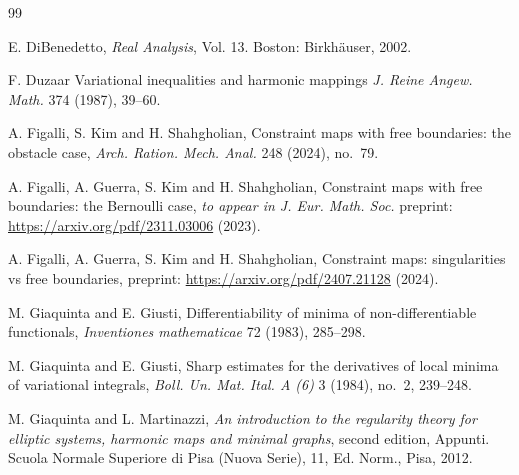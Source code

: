 \documentclass[11pt]{amsart}
\theoremstyle{plain}
\theoremstyle{definition}
\theoremstyle{remark}
\numberwithin{equation}{section}
\begin{document}








\begin{thebibliography}{99}

E. DiBenedetto,
{\it Real Analysis}, Vol. 13. Boston: Birkh\"auser, 2002.

F. Duzaar
Variational inequalities and harmonic mappings
{\it J. Reine Angew. Math.} 374 (1987), 39–60.

A. Figalli, S. Kim and H. Shahgholian,
Constraint maps with free boundaries: the obstacle case,
{\it Arch. Ration. Mech. Anal. } 248 (2024), no.\ 79.

A. Figalli, A. Guerra,  S. Kim and H. Shahgholian,
Constraint maps with free boundaries: the Bernoulli case,
{\it to appear in J. Eur. Math. Soc.} preprint: \url{https://arxiv.org/pdf/2311.03006} (2023). 

A. Figalli, A. Guerra, S. Kim and H. Shahgholian,
Constraint maps: singularities vs free boundaries,
preprint: \url{https://arxiv.org/pdf/2407.21128} (2024).


M. Giaquinta and E. Giusti, 
Differentiability of minima of non-differentiable functionals, 
{\it Inventiones mathematicae} 72 (1983), 285--298.

M. Giaquinta and E. Giusti, 
Sharp estimates for the derivatives of local minima of variational integrals, 
{\it Boll. Un. Mat. Ital. A (6)} 3 (1984), no.~2, 239--248.

M. Giaquinta and L. Martinazzi, 
{\it An introduction to the regularity theory for elliptic systems, harmonic maps and minimal graphs}, second edition, 
Appunti. Scuola Normale Superiore di Pisa (Nuova Serie), 11, Ed. Norm., Pisa, 2012.


\end{thebibliography}
\end{document}
